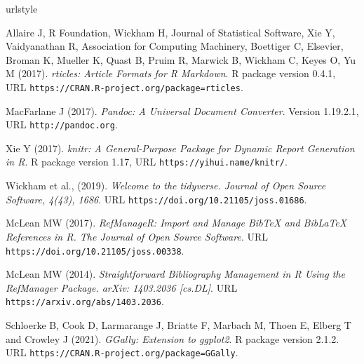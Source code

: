 \begin{thebibliography}{3}
\newcommand{\enquote}[1]{``#1''}
\providecommand{\natexlab}[1]{#1}
\providecommand{\url}[1]{\texttt{#1}}
\providecommand{\urlprefix}{URL }
\expandafter\ifx\csname urlstyle\endcsname\relax
  \providecommand{\doi}[1]{doi:\discretionary{}{}{}#1}\else
  \providecommand{\doi}{doi:\discretionary{}{}{}\begingroup
  \urlstyle{rm}\Url}\fi
\providecommand{\eprint}[2][]{\url{#2}}

Allaire J, {R Foundation}, Wickham H, {Journal of Statistical Software}, Xie Y,
  Vaidyanathan R, {Association for Computing Machinery}, Boettiger C,
  {Elsevier}, Broman K, Mueller K, Quast B, Pruim R, Marwick B, Wickham C,
  Keyes O, Yu M (2017).
\newblock \emph{rticles: Article Formats for R Markdown}.
\newblock R package version 0.4.1,
  \urlprefix\url{https://CRAN.R-project.org/package=rticles}.

MacFarlane J (2017).
\newblock \emph{Pandoc: A Universal Document Converter}.
\newblock Version 1.19.2.1, \urlprefix\url{http://pandoc.org}.

\bibitem[{Xie Y (2017)}]{}
Xie Y (2017).
\newblock \emph{knitr: A General-Purpose Package for Dynamic Report Generation
  in R}.
\newblock R package version 1.17, \urlprefix\url{https://yihui.name/knitr/}.

\bibitem[{Wickham et al., (2019)}]{}
Wickham et al., (2019).
\newblock \emph{Welcome to the tidyverse. Journal of Open
Source Software, 4(43), 1686}.
\newblock \urlprefix\url{https://doi.org/10.21105/joss.01686}.

\bibitem[{McLean MW(2017)}]{}
McLean MW (2017).
\newblock \emph{RefManageR: Import and Manage BibTeX and BibLaTeX
References in R. The Journal of Open Source Software}.
\newblock \urlprefix\url{https://doi.org/10.21105/joss.00338}.

\bibitem[{McLean MW (2014)}]{}
McLean MW (2014).
\newblock \emph{Straightforward Bibliography Management in R
Using the RefManager Package. arXiv: 1403.2036 [cs.DL]{}}.
\newblock \urlprefix\url{https://arxiv.org/abs/1403.2036}.

Schloerke B, Cook D, Larmarange J, Briatte F,
Marbach M, Thoen E, Elberg T and Crowley J (2021).
\newblock \emph{GGally: Extension to ggplot2}.
\newblock R package version 2.1.2. \urlprefix\url{https://CRAN.R-project.org/package=GGally}.


\end{thebibliography}
